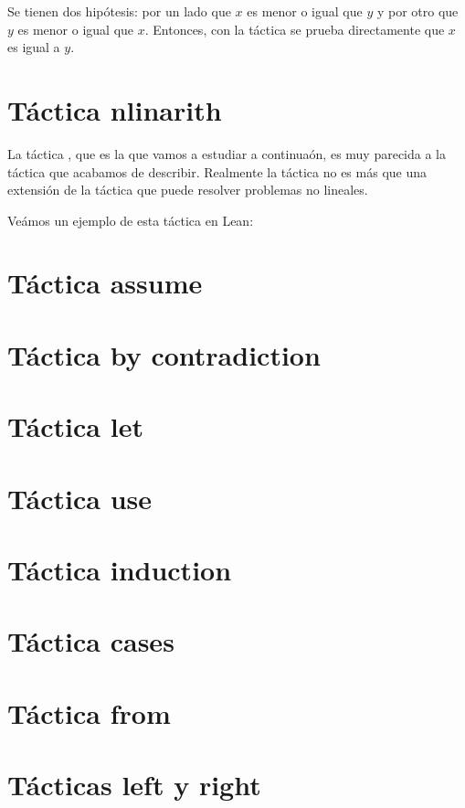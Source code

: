 Se tienen dos hipótesis: por un lado que \(x\) es menor o igual que \(y\) y por
otro que \(y\) es menor o igual que \(x\). Entonces, con la táctica
 se prueba directamente que \(x\) es igual a \(y\).

\section{Táctica nlinarith}
La táctica , que es la que vamos a estudiar a
continuaón, es muy parecida a la táctica  que
acabamos de describir. Realmente la táctica  no
es más que una extensión de la táctica  que puede
resolver problemas no lineales.

Veámos un ejemplo de esta táctica en Lean:
\section{Táctica assume}

\section{Táctica by contradiction}

\section{Táctica let}

\section{Táctica use}

\section{Táctica induction}

\section{Táctica cases}

\section{Táctica from}

\section{Tácticas left y right}


